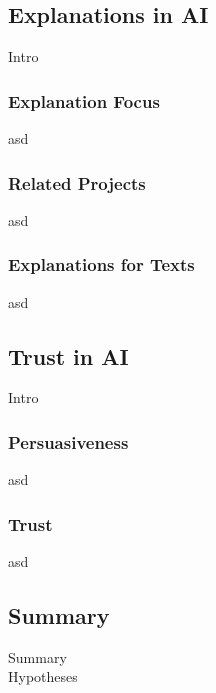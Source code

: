 \subsection{Explanations in AI}
Intro

\subsubsection{Explanation Focus}
asd

\subsubsection{Related Projects}
asd

\subsubsection{Explanations for Texts}
asd



\subsection{Trust in AI}
Intro

\subsubsection{Persuasiveness}
asd

\subsubsection{Trust}
asd



\subsection{Summary}
Summary\\
Hypotheses
